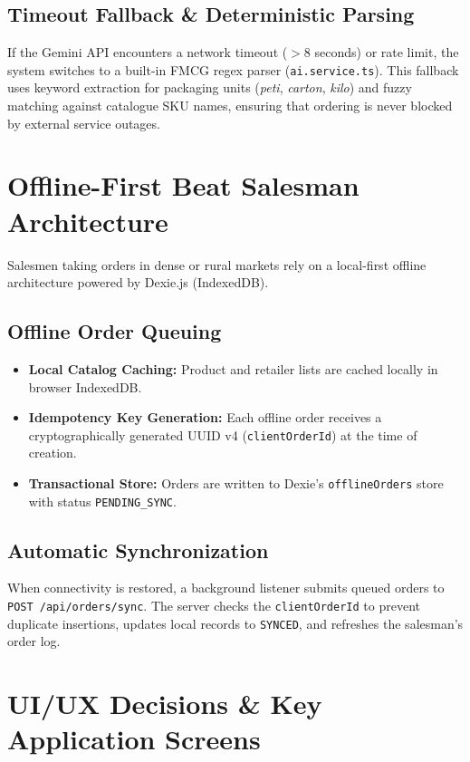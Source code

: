 \documentclass[11pt,a4paper]{article}
\begin{document}
\subsection{Timeout Fallback \& Deterministic Parsing}
If the Gemini API encounters a network timeout ($>8$ seconds) or rate limit, the system switches to a built-in FMCG regex parser (\texttt{ai.service.ts}). This fallback uses keyword extraction for packaging units (\textit{peti}, \textit{carton}, \textit{kilo}) and fuzzy matching against catalogue SKU names, ensuring that ordering is never blocked by external service outages.

\section{Offline-First Beat Salesman Architecture}

Salesmen taking orders in dense or rural markets rely on a local-first offline architecture powered by Dexie.js (IndexedDB).

\subsection{Offline Order Queuing}
\begin{itemize}[leftmargin=1.5cm]
    \item \textbf{Local Catalog Caching:} Product and retailer lists are cached locally in browser IndexedDB.
    \item \textbf{Idempotency Key Generation:} Each offline order receives a cryptographically generated UUID v4 (\texttt{clientOrderId}) at the time of creation.
    \item \textbf{Transactional Store:} Orders are written to Dexie's \texttt{offlineOrders} store with status \texttt{PENDING\_SYNC}.
\end{itemize}

\subsection{Automatic Synchronization}
When connectivity is restored, a background listener submits queued orders to \texttt{POST /api/orders/sync}. The server checks the \texttt{clientOrderId} to prevent duplicate insertions, updates local records to \texttt{SYNCED}, and refreshes the salesman's order log.

\section{UI/UX Decisions \& Key Application Screens}
\end{document}
